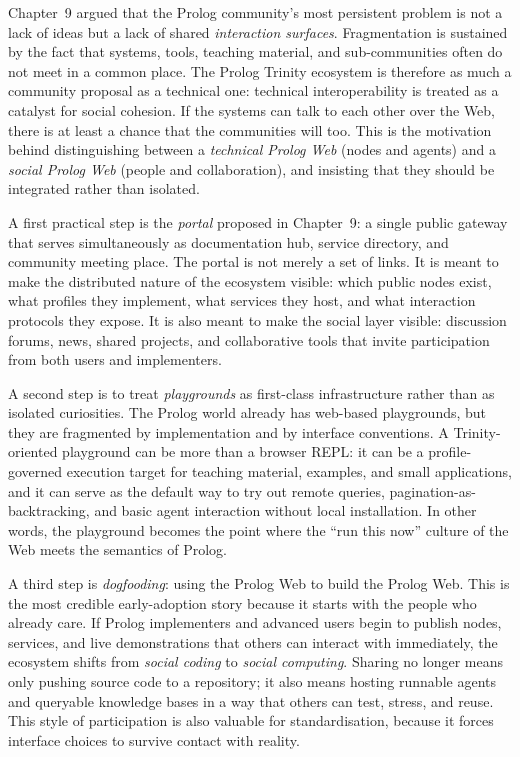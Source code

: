 Chapter~9 argued that the Prolog community's most persistent problem is not a lack of ideas but a lack of shared \emph{interaction surfaces}. Fragmentation is sustained by the fact that systems, tools, teaching material, and sub-communities often do not meet in a common place. The Prolog Trinity ecosystem is therefore as much a community proposal as a technical one: technical interoperability is treated as a catalyst for social cohesion. If the systems can talk to each other over the Web, there is at least a chance that the communities will too. This is the motivation behind distinguishing between a \emph{technical Prolog Web} (nodes and agents) and a \emph{social Prolog Web} (people and collaboration), and insisting that they should be integrated rather than isolated.

A first practical step is the \emph{portal} proposed in Chapter~9: a single public gateway that serves simultaneously as documentation hub, service directory, and community meeting place. The portal is not merely a set of links. It is meant to make the distributed nature of the ecosystem visible: which public nodes exist, what profiles they implement, what services they host, and what interaction protocols they expose. It is also meant to make the social layer visible: discussion forums, news, shared projects, and collaborative tools that invite participation from both users and implementers.

A second step is to treat \emph{playgrounds} as first-class infrastructure rather than as isolated curiosities. The Prolog world already has web-based playgrounds, but they are fragmented by implementation and by interface conventions. A Trinity-oriented playground can be more than a browser REPL: it can be a profile-governed execution target for teaching material, examples, and small applications, and it can serve as the default way to try out remote queries, pagination-as-backtracking, and basic agent interaction without local installation. In other words, the playground becomes the point where the ``run this now'' culture of the Web meets the semantics of Prolog.

A third step is \emph{dogfooding}: using the Prolog Web to build the Prolog Web. This is the most credible early-adoption story because it starts with the people who already care. If Prolog implementers and advanced users begin to publish nodes, services, and live demonstrations that others can interact with immediately, the ecosystem shifts from \emph{social coding} to \emph{social computing}. Sharing no longer means only pushing source code to a repository; it also means hosting runnable agents and queryable knowledge bases in a way that others can test, stress, and reuse. This style of participation is also valuable for standardisation, because it forces interface choices to survive contact with reality.

